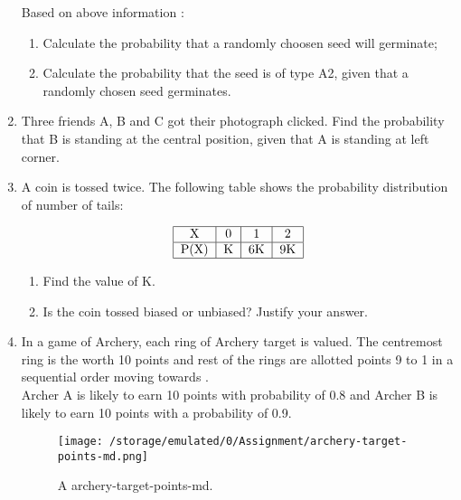 \documentclass[a4paper,12pt]{article}
\begin{document}
\begin{enumerate}
Based on above information :\

\begin{enumerate}
\item Calculate the probability that a randomly choosen seed will germinate; 

\item Calculate the probability that the seed is of type A2, given that a randomly chosen seed germinates.

\end{enumerate}
 
\item Three friends A, B and C got their photograph clicked. Find the probability that B is standing at the central position, given that A is standing at left corner. 

\item A coin is tossed twice. The following table shows the probability distribution of number of tails:

$$\begin{tabular}{|c|c|c|c|}
\hline
X & 0 & 1 & 2 \\
\hline
P(X) & K & 6K & 9K \\
\hline 

\end{tabular}$$

\begin{enumerate}
\item Find the value of K. 

\item Is the coin tossed biased or unbiased? Justify your answer.

\end{enumerate}

\item In a game of Archery, each ring of Archery target is valued. The centremost ring is the worth 10 points and rest of the rings are allotted points 9 to 1 in a sequential order moving towards .\\
Archer A is likely to earn 10 points with probability of 0.8 and Archer B is likely to earn 10 points with a probability of 0.9.\\

\begin{figure}[h!]
  \centering
  \texttt{[image: /storage/emulated/0/Assignment/archery-target-points-md.png]}
  \caption{A archery-target-points-md.}
  \label{fig:archery-target-points-md}
\end{figure}


\end{enumerate}
\end{document}
